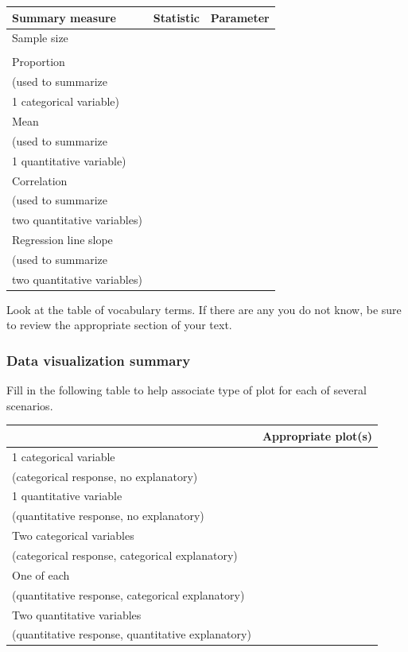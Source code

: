 \documentclass[
]{report}
\begin{document}
\begin{center}
\begin{tabular}{|l|p{2in}|p{2in}|}\hline
Summary measure & Statistic & Parameter \\ \hline
Sample size & & \\ 
& & \\ \hline
Proportion & & \\ 
(used to summarize & & \\ 
1 categorical variable) & & \\ \hline
Mean & & \\ 
(used to summarize & & \\ 
1 quantitative variable)& & \\ \hline
Correlation & & \\ 
(used to summarize & & \\ 
two quantitative variables)& & \\ \hline
Regression line slope & & \\ 
(used to summarize & & \\ 
two quantitative variables)& & \\ \hline
\end{tabular}
\end{center}

Look at the table of vocabulary terms. If there are any you do not know, be sure to review the appropriate section of your text.

\hypertarget{data-visualization-summary}{%
\subsubsection*{Data visualization summary}\label{data-visualization-summary}}

Fill in the following table to help associate type of plot for each of several scenarios.

\begin{center}
\begin{tabular}{|l|p{3in}|} \hline
 & Appropriate plot(s) \\ \hline
1 categorical variable & \\
(categorical response, no explanatory) & \\ \hline
1 quantitative variable  & \\
(quantitative response, no explanatory) & \\ \hline
Two categorical variables  & \\
(categorical response, categorical explanatory) & \\ \hline
One of each  & \\
(quantitative response, categorical explanatory) & \\ \hline
Two quantitative variables  & \\
(quantitative response, quantitative explanatory) & \\ \hline
\end{tabular}
\end{center}
\end{document}
